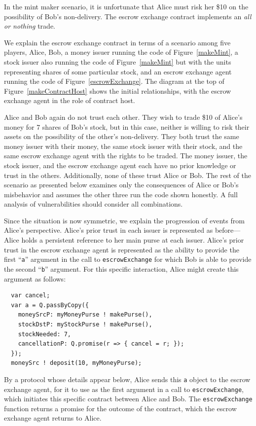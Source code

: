\documentclass{llncs}
\begin{document}
In the mint maker scenario, it is unfortunate that Alice must risk her \$10 on the possibility of Bob's non-delivery. The escrow exchange contract implements an \emph{all or nothing} trade.

We explain the escrow exchange contract in terms of a scenario among five players, Alice, Bob, a money issuer running the code of Figure~\ref{makeMint}, a stock issuer also running the code of Figure~\ref{makeMint} but with the units representing shares of some particular stock, and an escrow exchange agent running the code of Figure~\ref{escrowExchange}. The diagram at the top of Figure~\ref{makeContractHost} shows the initial relationships, with the escrow exchange agent in the role of contract host.

Alice and Bob again do not trust each other. They wish to trade \$10 of Alice's money for 7 shares of Bob's stock, but in this case, neither is willing to risk their assets on the possibility of the other's non-delivery. They both trust the same money issuer with their money, the same stock issuer with their stock, and the same escrow exchange agent with the rights to be traded. The money issuer, the stock issuer, and the escrow exchange agent each have no prior knowledge or trust in the others. Additionally, none of these trust Alice or Bob. The rest of the scenario as presented below examines only the consequences of Alice or Bob's misbehavior and assumes the other three run the code shown honestly. A full analysis of vulnerabilities should consider all combinations.

Since the situation is now symmetric, we explain the progression of events from Alice's perspective. Alice's prior trust in each issuer is represented as before---Alice holds a persistent reference to her main purse at each issuer. Alice's prior trust in the escrow exchange agent is represented as the ability to provide the first ``{\tt a}'' argument in the call to {\tt escrowExchange} for which Bob is able to provide the second ``{\tt b}'' argument. For this specific interaction, Alice might create this argument as follows:

\begin{verbatim}
  var cancel;
  var a = Q.passByCopy({
    moneySrcP: myMoneyPurse ! makePurse(),
    stockDstP: myStockPurse ! makePurse(),
    stockNeeded: 7,
    cancellationP: Q.promise(r => { cancel = r; });
  });
  moneySrc ! deposit(10, myMoneyPurse);
\end{verbatim}

By a protocol whose details appear below, Alice sends this {\tt a} object to the escrow exchange agent, for it to use as the first argument in a call to {\tt escrowExchange}, which initiates this specific contract between Alice and Bob. The {\tt escrowExchange} function returns a promise for the outcome of the contract, which the escrow exchange agent returns to Alice. 
\end{document}
